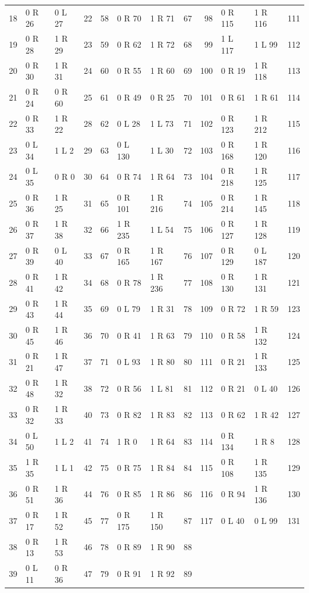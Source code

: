 \begin{center}
\begin{tabular}{@{}rllr@{\hspace{12pt}}rllr@{\hspace{12pt}}rllr@{}}
18 & 0 R 26 & 0 L 27 & 22 & 58 & 0 R 70 & 1 R 71 & 67 & 98 & 0 R 115 & 1 R 116 & 111\\
19 & 0 R 28 & 1 R 29 & 23 & 59 & 0 R 62 & 1 R 72 & 68 & 99 & 1 L 117 & 1 L 99 & 112\\
20 & 0 R 30 & 1 R 31 & 24 & 60 & 0 R 55 & 1 R 60 & 69 & 100 & 0 R 19 & 1 R 118 & 113\\
21 & 0 R 24 & 0 R 60 & 25 & 61 & 0 R 49 & 0 R 25 & 70 & 101 & 0 R 61 & 1 R 61 & 114\\
22 & 0 R 33 & 1 R 22 & 28 & 62 & 0 L 28 & 1 L 73 & 71 & 102 & 0 R 123 & 1 R 212 & 115\\
23 & 0 L 34 & 1 L 2 & 29 & 63 & 0 L 130 & 1 L 30 & 72 & 103 & 0 R 168 & 1 R 120 & 116\\
24 & 0 L 35 & 0 R 0 & 30 & 64 & 0 R 74 & 1 R 64 & 73 & 104 & 0 R 218 & 1 R 125 & 117\\
25 & 0 R 36 & 1 R 25 & 31 & 65 & 0 R 101 & 1 R 216 & 74 & 105 & 0 R 214 & 1 R 145 & 118\\
26 & 0 R 37 & 1 R 38 & 32 & 66 & 1 R 235 & 1 L 54 & 75 & 106 & 0 R 127 & 1 R 128 & 119\\
27 & 0 R 39 & 0 L 40 & 33 & 67 & 0 R 165 & 1 R 167 & 76 & 107 & 0 R 129 & 0 L 187 & 120\\
28 & 0 R 41 & 1 R 42 & 34 & 68 & 0 R 78 & 1 R 236 & 77 & 108 & 0 R 130 & 1 R 131 & 121\\
29 & 0 R 43 & 1 R 44 & 35 & 69 & 0 L 79 & 1 R 31 & 78 & 109 & 0 R 72 & 1 R 59 & 123\\
30 & 0 R 45 & 1 R 46 & 36 & 70 & 0 R 41 & 1 R 63 & 79 & 110 & 0 R 58 & 1 R 132 & 124\\
31 & 0 R 21 & 1 R 47 & 37 & 71 & 0 L 93 & 1 R 80 & 80 & 111 & 0 R 21 & 1 R 133 & 125\\
32 & 0 R 48 & 1 R 32 & 38 & 72 & 0 R 56 & 1 L 81 & 81 & 112 & 0 R 21 & 0 L 40 & 126\\
33 & 0 R 32 & 1 R 33 & 40 & 73 & 0 R 82 & 1 R 83 & 82 & 113 & 0 R 62 & 1 R 42 & 127\\
34 & 0 L 50 & 1 L 2 & 41 & 74 & 1 R 0 & 1 R 64 & 83 & 114 & 0 R 134 & 1 R 8 & 128\\
35 & 1 R 35 & 1 L 1 & 42 & 75 & 0 R 75 & 1 R 84 & 84 & 115 & 0 R 108 & 1 R 135 & 129\\
36 & 0 R 51 & 1 R 36 & 44 & 76 & 0 R 85 & 1 R 86 & 86 & 116 & 0 R 94 & 1 R 136 & 130\\
37 & 0 R 17 & 1 R 52 & 45 & 77 & 0 R 175 & 1 R 150 & 87 & 117 & 0 L 40 & 0 L 99 & 131\\
38 & 0 R 13 & 1 R 53 & 46 & 78 & 0 R 89 & 1 R 90 & 88 &  &  &  & \\
39 & 0 L 11 & 0 R 36 & 47 & 79 & 0 R 91 & 1 R 92 & 89 &  &  &  & \\
\bottomrule
\end{tabular}
\end{center}
